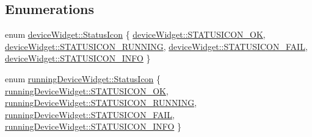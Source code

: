 \subsection*{Enumerations}
\begin{DoxyCompactItemize}
\item 
enum \hyperlink{group___y_modem_uploader_ga788236c4f7d8fe7586489a183528d657}{device\-Widget\-::\-Status\-Icon} \{ \hyperlink{group___y_modem_uploader_gga788236c4f7d8fe7586489a183528d657a8bca9ffd7e0d28d471e8b3f6aa52120c}{device\-Widget\-::\-S\-T\-A\-T\-U\-S\-I\-C\-O\-N\-\_\-\-O\-K}, 
\hyperlink{group___y_modem_uploader_gga788236c4f7d8fe7586489a183528d657a9930ae1923857bf1f78907ee4bb3baaa}{device\-Widget\-::\-S\-T\-A\-T\-U\-S\-I\-C\-O\-N\-\_\-\-R\-U\-N\-N\-I\-N\-G}, 
\hyperlink{group___y_modem_uploader_gga788236c4f7d8fe7586489a183528d657a72975044b2bc8aa1b97b1bd730059025}{device\-Widget\-::\-S\-T\-A\-T\-U\-S\-I\-C\-O\-N\-\_\-\-F\-A\-I\-L}, 
\hyperlink{group___y_modem_uploader_gga788236c4f7d8fe7586489a183528d657a7e4049feafb5e7f932619e41afda5257}{device\-Widget\-::\-S\-T\-A\-T\-U\-S\-I\-C\-O\-N\-\_\-\-I\-N\-F\-O}
 \}
\item 
enum \hyperlink{group___y_modem_uploader_ga2544534d93816d92882b9351db3e3832}{running\-Device\-Widget\-::\-Status\-Icon} \{ \hyperlink{group___y_modem_uploader_gga2544534d93816d92882b9351db3e3832a9ee79f7fd0f08c1c300815f7dda5f034}{running\-Device\-Widget\-::\-S\-T\-A\-T\-U\-S\-I\-C\-O\-N\-\_\-\-O\-K}, 
\hyperlink{group___y_modem_uploader_gga2544534d93816d92882b9351db3e3832a2dfa2228c471d23502656be472cfea8a}{running\-Device\-Widget\-::\-S\-T\-A\-T\-U\-S\-I\-C\-O\-N\-\_\-\-R\-U\-N\-N\-I\-N\-G}, 
\hyperlink{group___y_modem_uploader_gga2544534d93816d92882b9351db3e3832acbb5494d2fd96bb7d0b706e0125e0089}{running\-Device\-Widget\-::\-S\-T\-A\-T\-U\-S\-I\-C\-O\-N\-\_\-\-F\-A\-I\-L}, 
\hyperlink{group___y_modem_uploader_gga2544534d93816d92882b9351db3e3832acfa9666424709e360d9f9e7d9af00ab4}{running\-Device\-Widget\-::\-S\-T\-A\-T\-U\-S\-I\-C\-O\-N\-\_\-\-I\-N\-F\-O}
 \}
\end{DoxyCompactItemize}
